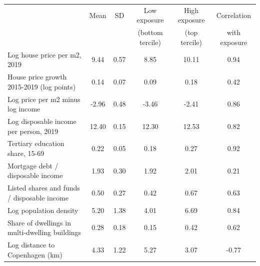 \begin{tabular}{lccccc}
\toprule
 & Mean & SD & Low exposure & High exposure & Correlation \\
 & & & (bottom tercile) & (top tercile) & with exposure \\
\midrule
Log house price per m2, 2019 &   9.44 &   0.57 &   8.85 &  10.11 &  0.94 \\
House price growth 2015-2019 (log points) &   0.14 &   0.07 &   0.09 &   0.18 &  0.42 \\
Log price per m2 minus log income &  -2.96 &   0.48 &  -3.46 &  -2.41 &  0.86 \\
Log disposable income per person, 2019 &  12.40 &   0.15 &  12.30 &  12.53 &  0.82 \\
Tertiary education share, 15-69 &   0.22 &   0.05 &   0.18 &   0.27 &  0.92 \\
Mortgage debt / disposable income &   1.93 &   0.30 &   1.92 &   2.01 &  0.21 \\
Listed shares and funds / disposable income &   0.50 &   0.27 &   0.42 &   0.67 &  0.63 \\
Log population density &   5.20 &   1.38 &   4.01 &   6.69 &  0.84 \\
Share of dwellings in multi-dwelling buildings &   0.28 &   0.18 &   0.15 &   0.42 &  0.62 \\
Log distance to Copenhagen (km) &   4.33 &   1.22 &   5.27 &   3.07 & -0.77 \\
\bottomrule
\end{tabular}
